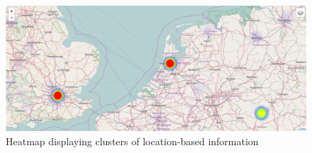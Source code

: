\begin{figure}[H]
  \centering
  \includegraphics[width=0.9\columnwidth]{images/Heatmap.png}
  \caption{Heatmap displaying clusters of location-based information}
\label{fig:images_map_heatmap}
\end{figure}

